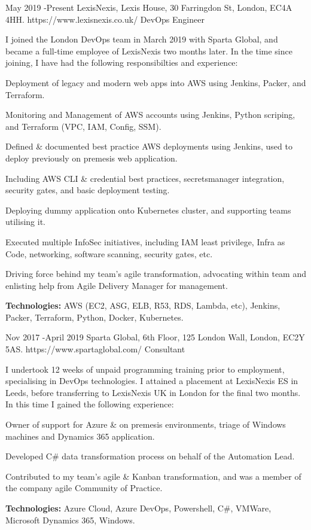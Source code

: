 \documentclass[10pt]{article} %
\begin{document}
\job
{May 2019 -}{Present}
{LexisNexis, Lexis House, 30 Farringdon St, London, EC4A 4HH.}
{https://www.lexisnexis.co.uk/}
{DevOps Engineer}
{
I joined the London DevOps team in March 2019 with Sparta Global, and became a full-time employee of LexisNexis two months later. In the time since joining, I have had the following responsibilties and experience:

\begin{itemize-noindent}[noitemsep]
\item{Deployment of legacy and modern web apps into AWS using Jenkins, Packer, and Terraform.}
\item{Monitoring and Management of AWS accounts using Jenkins, Python scriping, and Terraform (VPC, IAM, Config, SSM).}
\item{Defined \& documented best practice AWS deployments using Jenkins, used to deploy previously on premesis web application.}
\begin{itemize-noindent}[noitemsep]
\item{Including AWS CLI \& credential best practices, secretsmanager integration, security gates, and basic deployment testing.}
\end{itemize-noindent}
\item{Deploying dummy application onto Kubernetes cluster, and supporting teams utilising it.}
\item{Executed multiple InfoSec initiatives, including IAM least privilege, Infra as Code, networking, software scanning, security gates, etc.}
\item{Driving force behind my team's agile transformation, advocating within team and enlisting help from Agile Delivery Manager for management.}
\end{itemize-noindent}

\rule{0mm}{5mm}\textbf{Technologies:} AWS (EC2, ASG, ELB, R53, RDS, Lambda, etc), Jenkins, Packer, Terraform, Python, Docker, Kubernetes.}


\job
{Nov 2017 -}{April 2019}
{Sparta Global, 6th Floor, 125 London Wall, London, EC2Y 5AS.}
{https://www.spartaglobal.com/}
{Consultant}
{
I undertook 12 weeks of unpaid programming training prior to employment, specialising in DevOps technologies. I attained a placement at LexisNexis ES in Leeds, before transferring to LexisNexis UK in London for the final two months. In this time I gained the following experience: 

\begin{itemize-noindent}[noitemsep]
\item{Owner of support for Azure \& on premesis environments, triage of Windows machines and Dynamics 365 application.}
\item{Developed C\# data transformation process on behalf of the Automation Lead.}
\item{Contributed to my team's agile \& Kanban transformation, and was a member of the company agile Community of Practice.}
\end{itemize-noindent}

\rule{0mm}{5mm}\textbf{Technologies:} Azure Cloud, Azure DevOps, Powershell, C\#, VMWare, Microsoft Dynamics 365, Windows.}
\end{document}
